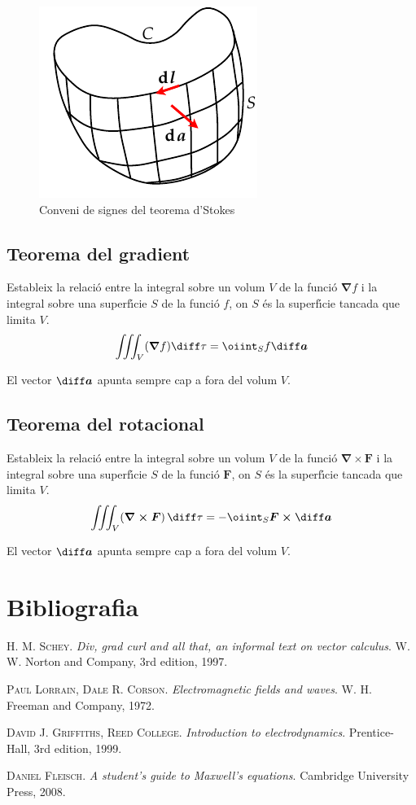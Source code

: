 \documentclass[catalan,a4paper,twoside,11pt]{article}
\begin{document}
\begin{figure}[h]
\centering
     \includegraphics{Imatges/Stokes.pdf}
\caption{Conveni de signes del teorema d'Stokes}
\label{pic:signe-teo-stockes}
\end{figure}


\subsection{Teorema del gradient}
Estableix la relaci\'{o} entre la integral sobre un volum $V$ de la funci\'{o} $\boldsymbol{\nabla}f$ i la integral sobre una superf\'{\i}cie $S$ de la funci\'{o} $f$, on $S$ \'{e}s la superf\'{\i}cie tancada que limita $V$.
\begin{equation}
    \iiint_V(\boldsymbol{\nabla}f)\diff \tau = \oiint_S f\boldsymbol{\diff a}
\end{equation}

El vector $\boldsymbol{\diff a}$ apunta sempre cap a fora del volum $V$.

\subsection{Teorema del rotacional}
Estableix la relaci\'{o} entre la integral sobre un volum $V$ de la funci\'{o} $\boldsymbol{\nabla\times F}$ i la integral sobre una superf\'{\i}cie $S$ de la funci\'{o} $\boldsymbol{F}$, on $S$ \'{e}s la superf\'{\i}cie tancada que limita $V$.
\begin{equation}
    \iiint_V(\boldsymbol{\nabla\times F})\,\diff \tau=-\oiint_S
    \boldsymbol{F\times\diff a}
\end{equation}

El vector $\boldsymbol{\diff a}$ apunta sempre cap a fora del volum $V$.

\section{Bibliografia}

\textsc{H. M. Schey}. \textit{Div, grad curl and all that, an informal text on vector calculus}.  W. W. Norton and Company, 3rd edition, 1997.

\textsc{Paul Lorrain, Dale R. Corson}. \textit{Electromagnetic fields and waves}.  W. H. Freeman and Company, 1972.

\textsc{David J. Griffiths, Reed College}. \textit{Introduction to electrodynamics}. Prentice-Hall, 3rd edition, 1999.

\textsc{Daniel Fleisch}. \textit{A student's guide to Maxwell's equations}. Cambridge University Press, 2008.
\end{document}
